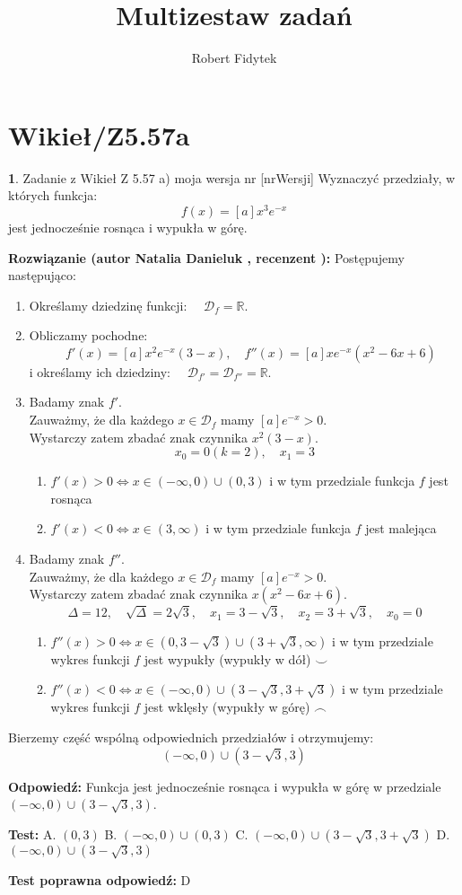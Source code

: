 \documentclass[12pt, a4paper]{article}
\title{Multizestaw zadań}
\author{Robert Fidytek}
\date{}
\theoremstyle{definition} %
\newtheorem{zad}{}
\newcommand{\kategoria}[1]{\section{#1}} %
\newcommand{\zadStart}[1]{\begin{zad}#1\newline} %
\newcommand{\zadStop}{\end{zad}}   %
\newcommand{\rozwStart}[2]{\noindent \textbf{Rozwiązanie (autor #1 , recenzent #2): }\newline} %
\newcommand{\rozwStop}{\newline}                                            %
\newcommand{\odpStart}{\noindent \textbf{Odpowiedź:}\newline}    %
\newcommand{\odpStop}{\newline}                                             %
\newcommand{\testStart}{\noindent \textbf{Test:}\newline} %
\newcommand{\testStop}{\newline} %
\newcommand{\kluczStart}{\noindent \textbf{Test poprawna odpowiedź:}\newline} %
\newcommand{\kluczStop}{\newline} %
\begin{document}
\maketitle

\kategoria{Wikieł/Z5.57a}

\zadStart{Zadanie z Wikieł Z 5.57 a) moja wersja nr [nrWersji]}
Wyznaczyć przedziały, w których funkcja:
$$f(x) = [a]x^3 e^{-x}$$
jest jednocześnie rosnąca i wypukła w górę.
\zadStop

\rozwStart{Natalia Danieluk}{}
Postępujemy następująco:
\begin{enumerate}
\item Określamy dziedzinę funkcji: $\quad \mathcal{D}_f=\mathbb{R}$. \\
\item Obliczamy pochodne: 
$$\quad f'(x) = [a]x^2e^{-x}(3-x),\quad f''(x) = [a]xe^{-x}(x^2-6x+6)$$
i określamy ich dziedziny: $\quad \mathcal{D}_{f'}=\mathcal{D}_{f''}=\mathbb{R}$.\\
\item Badamy znak $f'$. \\
Zauważmy, że dla każdego $x \in \mathcal{D}_f$ mamy $[a]e^{-x} > 0$. \\
Wystarczy zatem zbadać znak czynnika $x^2(3-x)$.
$$x_0 = 0 (k=2), \quad x_1 = 3$$
	\begin{enumerate}
	\item $f'(x) > 0 \Leftrightarrow x \in (-\infty,0)\cup(0,3)$ i w tym przedziale funkcja $f$ jest rosnąca \\
	\item $f'(x) < 0 \Leftrightarrow x \in (3,\infty)$ i w tym przedziale funkcja $f$ jest malejąca 
	\end{enumerate}
\item Badamy znak $f''$. \\
Zauważmy, że dla każdego $x \in \mathcal{D}_f$ mamy $[a]e^{-x} > 0$. \\
Wystarczy zatem zbadać znak czynnika $x(x^2-6x+6)$.
$$\Delta = 12, \quad \sqrt{\Delta} = 2\sqrt{3}, \quad x_1 = 3 - \sqrt{3}, \quad x_2 = 3 + \sqrt{3}, \quad x_0 = 0$$
	\begin{enumerate}
	\item $f''(x) > 0 \Leftrightarrow x \in (0,3 - \sqrt{3})\cup(3 + \sqrt{3},\infty)$ i w tym przedziale wykres funkcji $f$ jest wypukły (wypukły w dół) $ \smile $ \\
	\item $f''(x) < 0 \Leftrightarrow x \in (-\infty,0)\cup(3 - \sqrt{3},3 + \sqrt{3})$ i w tym przedziale wykres funkcji $f$ jest wklęsły (wypukły w górę) $ \frown $
	\end{enumerate}
\end{enumerate}
Bierzemy część wspólną odpowiednich przedziałów i otrzymujemy: $$(-\infty,0)\cup(3 - \sqrt{3},3)$$
\rozwStop

\odpStart
Funkcja jest jednocześnie rosnąca i wypukła w górę w przedziale $(-\infty,0)\cup(3 - \sqrt{3},3)$.
\odpStop

\testStart
A. $(0,3)$
B. $(-\infty,0)\cup(0,3)$
C. $(-\infty,0)\cup(3 - \sqrt{3},3 + \sqrt{3})$
D. $(-\infty,0)\cup(3 - \sqrt{3},3)$
\testStop

\kluczStart
D
\kluczStop
\end{document}
